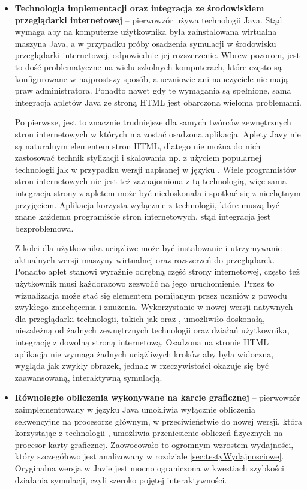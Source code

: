\begin{itemize}

\item \textbf{Technologia implementacji oraz integracja ze środowiskiem
przeglądarki internetowej} -- pierwowzór używa technologii Java. Stąd wymaga aby
na komputerze użytkownika była zainstalowana wirtualna maszyna Java, a w
przypadku próby osadzenia symulacji w środowisku przeglądarki internetowej,
odpowiednie jej rozszerzenie. Wbrew pozorom, jest to dość problematyczne na
wielu szkolnych komputerach, które często są konfigurowane w najprostszy sposób,
a uczniowie ani nauczyciele nie mają praw administratora. Ponadto nawet gdy te
wymagania są spełnione, sama integracja apletów Java ze stroną HTML jest
obarczona wieloma problemami.

Po pierwsze, jest to znacznie trudniejsze dla samych twórców zewnętrznych stron
internetowych w których ma zostać osadzona aplikacja. Aplety Javy nie są
naturalnym elementem stron HTML, dlatego nie można do nich zastosować technik
stylizacji i skalowania np. z użyciem popularnej technologii  jak w
przypadku wersji \en napisanej w języku \js. Wiele programistów stron
internetowych nie jest też zaznajomiona z tą technologią, więc sama integracja
strony z apletem może być niedoskonała i spotkać się z niechętnym przyjęciem.
Aplikacja \en \js korzysta wyłącznie z technologii, które muszą być znane
każdemu programiście stron internetowych, stąd integracja jest bezproblemowa.

Z kolei dla użytkownika uciążliwe może być instalowanie i utrzymywanie
aktualnych wersji maszyny wirtualnej oraz rozszerzeń do przeglądarek. Ponadto
aplet stanowi wyraźnie odrębną część strony internetowej, często też użytkownik
musi każdorazowo zezwolić na jego uruchomienie. Przez to wizualizacja może stać
się elementem pomijanym przez uczniów z powodu zwykłego zniechęcenia i znużenia.
Wykorzystanie w nowej wersji natywnych dla przeglądarki technologii, takich jak
\js oraz , umożliwiło doskonałą, niezależną od żadnych zewnętrznych
technologii oraz działań użytkownika, integrację z dowolną stroną internetową.
Osadzona na stronie HTML aplikacja nie wymaga żadnych uciążliwych kroków aby
była widoczna, wygląda jak zwykły obrazek, jednak w rzeczywistości okazuje się
być zaawansowaną, interaktywną symulacją.

\item \textbf{Równoległe obliczenia wykonywane na karcie graficznej} --
pierwowzór zaimplementowany w języku Java umożliwia wyłącznie obliczenia
sekwencyjne na procesorze głównym, w przeciwieństwie do nowej wersji, która
korzystając z technologii , umożliwia przeniesienie obliczeń
fizycznych na procesor karty graficznej. Zaowocowało to ogromnym wzrostem
wydajności, który szczegółowo jest analizowany w rozdziale
\ref{sec:testyWydajnosciowe}. Oryginalna wersja w Javie jest mocno ograniczona w
kwestiach szybkości działania symulacji, czyli szeroko pojętej interaktywności.


\end{itemize}
